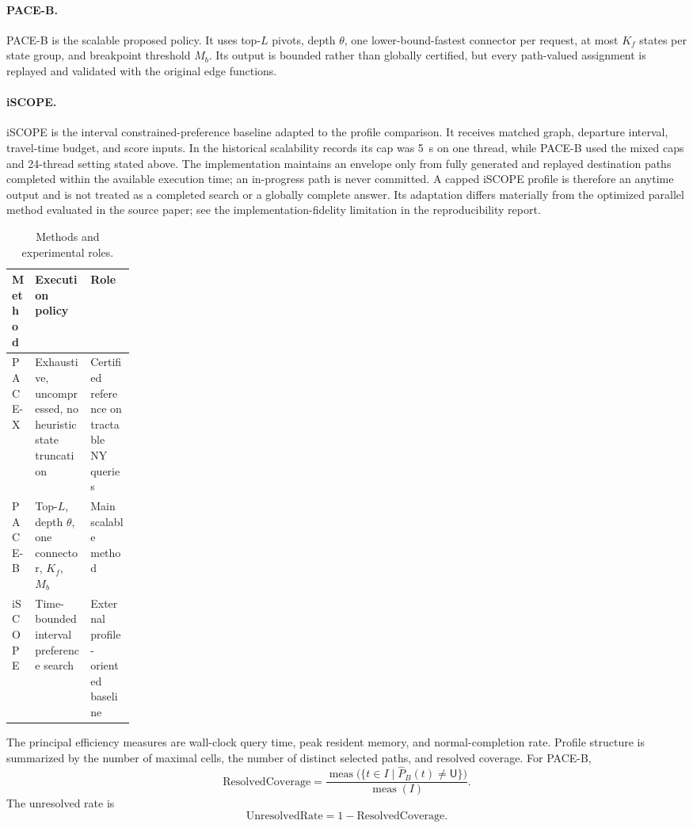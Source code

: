 \documentclass[a4paper,fleqn]{cas-dc}
\begin{document}
\paragraph{PACE-B.}
PACE-B is the scalable proposed policy. It uses top-\(L\) pivots, depth \(\theta\), one lower-bound-fastest connector per request, at most \(K_f\) states per state group, and breakpoint threshold \(M_b\). Its output is bounded rather than globally certified, but every path-valued assignment is replayed and validated with the original edge functions.

\paragraph{iSCOPE.}
iSCOPE is the interval constrained-preference baseline adapted to the profile comparison. It receives matched graph, departure interval, travel-time budget, and score inputs. In the historical scalability records its cap was 5~s on one thread, while PACE-B used the mixed caps and 24-thread setting stated above. The implementation maintains an envelope only from fully generated and replayed destination paths completed within the available execution time; an in-progress path is never committed. A capped iSCOPE profile is therefore an anytime output and is not treated as a completed search or a globally complete answer. Its adaptation differs materially from the optimized parallel method evaluated in the source paper; see the implementation-fidelity limitation in the reproducibility report.

\begin{table}[t]
\centering
\caption{Methods and experimental roles.}
\label{tab:compared_methods}
\scriptsize
\begin{tabularx}{\linewidth}{@{}p{0.18\linewidth}XX@{}}
\toprule
\textbf{Method} & \textbf{Execution policy} & \textbf{Role} \\
\midrule
PACE-X & Exhaustive, uncompressed, no heuristic state truncation & Certified reference on tractable NY queries \\
PACE-B & Top-\(L\), depth \(\theta\), one connector, \(K_f\), \(M_b\) & Main scalable method \\
iSCOPE & Time-bounded interval preference search & External profile-oriented baseline \\
\bottomrule
\end{tabularx}
\end{table}

The principal efficiency measures are wall-clock query time, peak resident memory, and normal-completion rate. Profile structure is summarized by the number of maximal cells, the number of distinct selected paths, and resolved coverage. For PACE-B,
\[
\mathrm{ResolvedCoverage}
=
\frac{
\operatorname{meas}\bigl(\{t\in I\mid\widehat P_B(t)\neq\mathsf U\}\bigr)
}{\operatorname{meas}(I)}.
\]
The unresolved rate is
\[
\mathrm{UnresolvedRate}=1-\mathrm{ResolvedCoverage}.
\]
\end{document}

